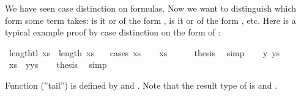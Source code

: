\begin{isabellebody}
\begin{isamarkuptext}
We have seen case distinction on formulas. Now we want to distinguish
which form some term takes: is it  or of the form ,
is it  or of the form , etc. Here is a typical example
proof by case distinction on the form of :%
\end{isamarkuptext}%
\isamarkuptrue%
\isamarkupfalse%
\ {}length{}tl\ xs{}\ {}\ length\ xs\ {}\ {}{}\isanewline
%
\isadelimproof
%
\endisadelimproof
%
\isatagproof
{}\isamarkupfalse%
\ {}cases\ xs{}\isanewline
\ \ \isamarkupfalse%
\ {}xs\ {}\ {}{}{}\isanewline
\ \ \isamarkupfalse%
\ {}thesis\ \isamarkupfalse%
\ simp\isanewline
{}\isamarkupfalse%
\isanewline
\ \ \isamarkupfalse%
\ y\ ys\ \isamarkupfalse%
\ {}xs\ {}\ y{}ys{}\isanewline
\ \ \isamarkupfalse%
\ {}thesis\ \isamarkupfalse%
\ simp\isanewline
{}\isamarkupfalse%
%
\endisatagproof
{\isafoldproof}%
%
\isadelimproof
%
\endisadelimproof
%
\begin{isamarkuptext}%
Function  (''tail'') is defined by  and
. Note that the result type of  is 
and .


\end{isamarkuptext}
\end{isabellebody}
